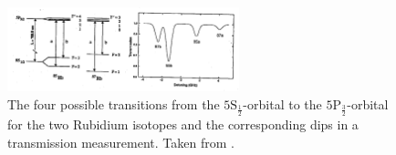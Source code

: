         
        \begin{figure}[h]
            \centering
            \includegraphics[width = 0.6\textwidth]{pictures/Rb.png}
            \caption{The four possible transitions from the $\text{5S}_{\frac{1}{2}}$-orbital to the $\text{5P}_{\frac{3}{2}}$-orbital for the two Rubidium isotopes and the corresponding dips in a transmission measurement. Taken from \cite{tu_dortmund_versuchsanleitung_2022-1}.}
            \label{fig:Rb}
        \end{figure}
    
        \FloatBarrier
         
        